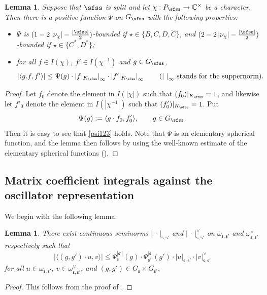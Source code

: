 \documentclass[11pt,a4paper]{amsart}
\def\abs#1{\left|{#1}\right|}
\newcommand{\la}{\langle}
\newcommand{\ra}{\rangle}
\newcommand{\be}{\begin {equation}}
\newcommand{\ee}{\end {equation}}
\numberwithin{equation}{section}
\newtheorem{lem}[thm]{Lemma}
\theoremstyle{remark}
\begin{document}
\begin{lem}\label{growthdp}
Suppose that $\sfss$ is split and let $\chi: P_\sfss\rightarrow \C^\times$ be a character. Then there is a positive function $\Psi$ on $G_\sfss$ with the following properties:
\begin{itemize}
\item
 $\Psi$ is $(1-2\abs{\nu_\chi}-\frac{\abs{\sfss}}{2})$-bounded if $\star\in \{B,C,D, \widetilde C\}$, and  $(2-2\abs{\nu_\chi}-\frac{\abs{\sfss}}{2})$-bounded if $\star\in \{C^*,D^*\}$;
 \item
for all $f\in I(\chi)$, $f'\in I(\chi^{-1})$ and $g\in G_\sfss$,
\be\label{psi123}
\abs{ \la g.f, f'\ra}\leq \Psi(g) \cdot \abs{f|_{K_\sfss}}_\infty \cdot \abs{f'|_{K_\sfss}}_\infty\qquad(\textrm{$\abs{\,\,}_\infty$ stands for the suppernorm}).
\ee
\end{itemize}
\end{lem}
\begin{proof}

 Let $f_0$ denote the element in $I(\abs{\chi})$ such that $(f_0)|_{K_\sfss}=1$, and likewise let $f'_0$ denote the element in $I(\abs{\chi^{-1}})$ such that $(f'_0)|_{K_\sfss}=1$. Put
 \[
   \Psi(g):=\la g \cdot f_0, f_0'\ra, \qquad g\in G_\sfss.
 \]
 Then it is easy to see that \eqref{psi123} holds. Note that $\Psi$ is an elementary spherical function, and the lemma then follows by using the well-known estimate of the elementary spherical functions (\cite[Lemma 3.6.7]{Wa1}).
\end{proof}



\subsection{Matrix coefficient integrals against the oscillator representation}

We begin with the following lemma.

\begin{lem}\label{matrico}
 There exist continuous seminorms $\abs{\,\cdot\,}_{\mathsf s, \mathsf s'}$ and $\abs{\,\cdot\,}_{\mathsf s, \mathsf s'}^\vee$ on  $ \omega_{\mathsf s, \mathsf s'}$ and $\omega_{\mathsf s, \mathsf s'}^\vee$ respectively such that
\[
 \abs{ \la (g,g')\cdot u, v\ra}\leq \Psi_{\mathsf s}^{\abs{\mathsf s'}}(g)\cdot \Psi_{\mathsf s'}^{\abs{\mathsf s}}(g')\cdot \abs{u}_{\mathsf s, \mathsf s'}\cdot \abs{v}_{\mathsf s, \mathsf s'}^\vee
\]
for all $u\in \omega_{\mathsf s, \mathsf s'}$, $v\in \omega_{\mathsf s, \mathsf s'}^\vee$, and $(g,g')\in G_{\mathsf s}\times G_{\mathsf s'}$.
\end{lem}
\begin{proof}
  This follows from the  proof of \cite[Theorem 3.2]{Li89}.
\end{proof}
\end{document}
